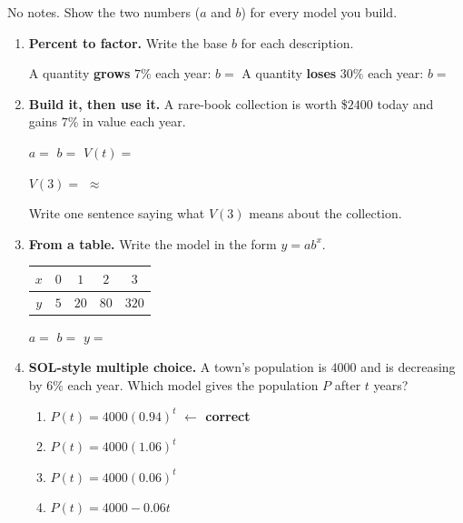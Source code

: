 \documentclass[10pt]{article}
\begin{document}
\namedateperiod

\vspace{0.08in}

No notes. Show the two numbers ($a$ and $b$) for every model you build.

\begin{enumerate}[leftmargin=1.8em, itemsep=9pt]
  \item \textbf{Percent to factor.} Write the base $b$ for each description.

        \vspace{3pt}
        A quantity \textbf{grows} $7\%$ each year: \; $b=$  \qquad
        A quantity \textbf{loses} $30\%$ each year: \; $b=$ 

  \item \textbf{Build it, then use it.} A rare-book collection is worth \$$2400$ today and gains
        $7\%$ in value each year.

        \vspace{3pt}
        $a=$  \quad $b=$  \quad
        $V(t)=$ 

        \vspace{4pt}
        $V(3)=$  $\approx$ 

        \vspace{3pt}
        Write one sentence saying what $V(3)$ means about the collection.

  \item \textbf{From a table.} Write the model in the form $y=ab^{x}$.
    \begin{center}
    \renewcommand{\arraystretch}{1.3}
    \begin{tabular}{|c|c|c|c|c|}
    \hline
    $x$ & $0$ & $1$ & $2$ & $3$ \\ \hline
    $y$ & $5$ & $20$ & $80$ & $320$ \\ \hline
    \end{tabular}
    \end{center}
    $a=$  \quad $b=$  \quad $y=$ 

  \item \textbf{SOL-style multiple choice.} A town's population is $4000$ and is decreasing by $6\%$
        each year. Which model gives the population $P$ after $t$ years?
        \begin{enumerate}[label=\Alph*., leftmargin=1.9em, itemsep=1pt]
          \item $P(t) = 4000(0.94)^{t}$ \quad \textcolor{keyred}{\textbf{$\leftarrow$ correct}}
          \item $P(t) = 4000(1.06)^{t}$
          \item $P(t) = 4000(0.06)^{t}$
          \item $P(t) = 4000 - 0.06t$
        \end{enumerate}
\end{enumerate}
\end{document}

